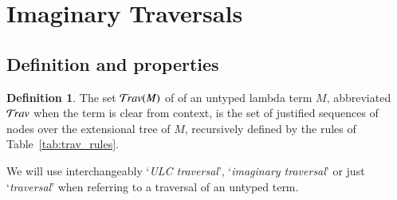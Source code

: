 \documentclass{elsarticle}
\theoremstyle{plain}
\theoremstyle{definition}
\newtheorem{definition}{Definition}[section]
\newcommand{\travulc}{\travset}
\begin{document}
\section{Imaginary Traversals}
\label{sec:imaginary_traversals}
\subsection{Definition and properties}

\begin{definition}
The set $\travulc(M)$ of  of an untyped lambda term $M$, abbreviated $\travulc$ when the term is clear from context, is the set of justified sequences of nodes over the extensional tree of $M$, recursively defined by the rules of Table~\ref{tab:trav_rules}.

We will use interchangeably `\emph{ULC traversal}', `\emph{imaginary traversal}' or just `\emph{traversal}' when referring to a traversal of an untyped term.
\end{definition}
\end{document}
